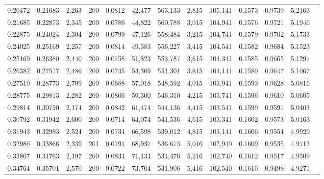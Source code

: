 \begin{tabular}{rrrrrrrrrrrrr}
0.20472 & 0.21683 & 2,263 & 200 &                                     0.0812 &  42,477 & 563,133 &   2,815 & 105,141 & 0.1573 & 0.9739 & 5.2163 \\
0.21685 & 0.22873 & 2,345 & 200 &                                     0.0786 &  44,822 & 560,788 &   3,015 & 104,941 & 0.1576 & 0.9721 & 5.1946 \\
0.22875 & 0.24024 & 2,304 & 200 &                                     0.0799 &  47,126 & 558,484 &   3,215 & 104,741 & 0.1579 & 0.9702 & 5.1733 \\
0.24025 & 0.25169 & 2,257 & 200 &                                     0.0814 &  49,383 & 556,227 &   3,415 & 104,541 & 0.1582 & 0.9684 & 5.1523 \\
0.25169 & 0.26380 & 2,440 & 200 &                                     0.0758 &  51,823 & 553,787 &   3,615 & 104,341 & 0.1585 & 0.9665 & 5.1297 \\
0.26382 & 0.27517 & 2,486 & 200 &                                     0.0745 &  54,309 & 551,301 &   3,815 & 104,141 & 0.1589 & 0.9647 & 5.1067 \\
0.27519 & 0.28773 & 2,709 & 200 &                                     0.0688 &  57,018 & 548,592 &   4,015 & 103,941 & 0.1593 & 0.9628 & 5.0816 \\
0.28775 & 0.29813 & 2,282 & 200 &                                     0.0806 &  59,300 & 546,310 &   4,215 & 103,741 & 0.1596 & 0.9610 & 5.0605 \\
0.29814 & 0.30790 & 2,174 & 200 &                                     0.0842 &  61,474 & 544,136 &   4,415 & 103,541 & 0.1599 & 0.9591 & 5.0403 \\
0.30792 & 0.31942 & 2,600 & 200 &                                     0.0714 &  64,074 & 541,536 &   4,615 & 103,341 & 0.1602 & 0.9573 & 5.0163 \\
0.31943 & 0.32983 & 2,524 & 200 &                                     0.0734 &  66,598 & 539,012 &   4,815 & 103,141 & 0.1606 & 0.9554 & 4.9929 \\
0.32986 & 0.33866 & 2,339 & 201 &                                     0.0791 &  68,937 & 536,673 &   5,016 & 102,940 & 0.1609 & 0.9535 & 4.9712 \\
0.33867 & 0.34763 & 2,197 & 200 &                                     0.0834 &  71,134 & 534,476 &   5,216 & 102,740 & 0.1612 & 0.9517 & 4.9509 \\
0.34764 & 0.35701 & 2,570 & 200 &                                     0.0722 &  73,704 & 531,906 &   5,416 & 102,540 & 0.1616 & 0.9498 & 4.9271 \\

\end{tabular}
